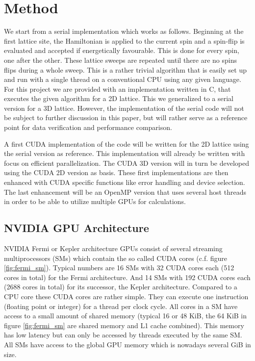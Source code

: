 \documentclass[paper=a4, fontsize=11pt]{scrartcl} %
\numberwithin{equation}{section} %
\numberwithin{figure}{section} %
\numberwithin{table}{section} %
\begin{document}
\section{Method}
\label{sec:method}
We start from a serial implementation which works as follows. Beginning at the first lattice site, the Hamiltonian is applied to the current spin and a spin-flip is evaluated and accepted if energetically favourable. This is done for every spin, one after the other. These lattice sweeps are repeated until there are no spins flips during a whole sweep. This is a rather trivial algorithm that is easily set up and run with a single thread on a conventional CPU using any given language. For this project we are provided with an implementation written in C, that executes the given algorithm for a 2D lattice. This we generalized to a serial version for a 3D lattice. However, the implementation of the serial code will not be subject to further discussion in this paper, but will rather serve as a reference point for data verification and performance comparison.

A first CUDA implementation of the code will be written for the 2D lattice using the serial version as reference. This implementation will already be written with focus on efficient parallelization. The CUDA 3D version will in turn be developed using the CUDA 2D version as basis. These first implementations are then enhanced with CUDA specific functions like error handling and device selection. The last enhancement will be an OpenMP version that uses several host threads in order to be able to utilize multiple GPUs for calculations.

\subsection{NVIDIA GPU Architecture}
NVIDIA Fermi or Kepler architecture GPUs consist of several streaming multiprocessors (SMs) which contain the so called CUDA cores (c.f. figure \ref{fig:fermi_sm}). Typical numbers are 16 SMs with 32 CUDA cores each (512 cores in total) for the Fermi architecture. And 14 SMs with 192 CUDA cores each (2688 cores in total) for its successor, the Kepler architecture. Compared to a CPU core these CUDA cores are rather simple. They can execute one instruction (floating point or integer) for a thread per clock cycle. All cores in a SM have access to a small amount of shared memory (typical 16 or 48 KiB, the 64 KiB in figure \ref{fig:fermi_sm} are shared memory and L1 cache combined). This memory has low latency but can only be accessed by threads executed by the same SM. All SMs have access to the global GPU memory which is nowadays several GiB in size.
\end{document}
